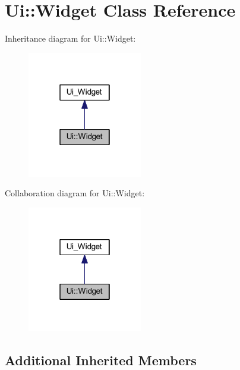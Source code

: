 \hypertarget{class_ui_1_1_widget}{}\section{Ui::Widget Class Reference}
\label{class_ui_1_1_widget}


Inheritance diagram for Ui::Widget:\nopagebreak
\begin{figure}[H]
\begin{center}
\leavevmode
\includegraphics[width=142pt]{class_ui_1_1_widget__inherit__graph}
\end{center}
\end{figure}


Collaboration diagram for Ui::Widget:\nopagebreak
\begin{figure}[H]
\begin{center}
\leavevmode
\includegraphics[width=142pt]{class_ui_1_1_widget__coll__graph}
\end{center}
\end{figure}
\subsection*{Additional Inherited Members}
